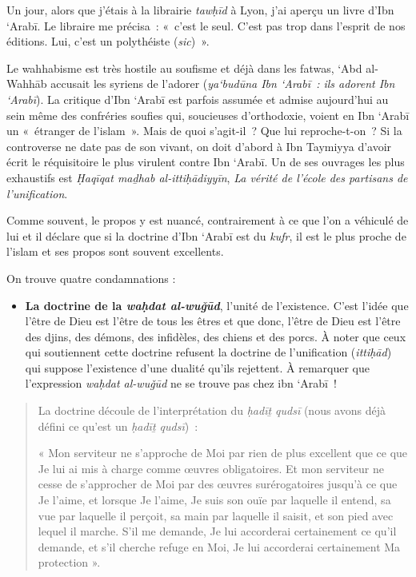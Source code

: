Un jour, alors que j'étais à la librairie \emph{tawḥīd} à Lyon, j'ai
aperçu un livre d'Ibn `Arabī. Le libraire me précisa~: «~c'est le seul.
C'est pas trop dans l'esprit de nos éditions. Lui, c'est un polythéiste
(\emph{sic})~».

Le wahhabisme est très hostile au soufisme et déjà dans les fatwas, `Abd
al-Wahhāb accusait les syriens de l'adorer (\emph{ya`budūna Ibn `Arabī~:
ils adorent Ibn `Arabī}). La critique d'Ibn `Arabī est parfois assumée et
admise aujourd'hui au sein même des confréries soufies qui, soucieuses
d'orthodoxie, voient en Ibn `Arabī un «~étranger de l'islam~». Mais de
quoi s'agit-il~? Que lui reproche-t-on~? Si la controverse ne date pas
de son vivant, on doit d'abord à Ibn Taymiyya d'avoir écrit le
réquisitoire le plus virulent contre Ibn `Arabī. Un de ses ouvrages les
plus exhaustifs est \emph{Ḥaqīqat maḏhab al-ittiḥādiyyīn}, \emph{La
vérité de l'école des partisans de l'unification}.

Comme souvent, le propos y est nuancé, contrairement à ce que l'on a
véhiculé de lui et il déclare que si la doctrine d'Ibn `Arabī est du
\emph{kufr}, il est le plus proche de l'islam et ses propos sont souvent
excellents.

On trouve quatre condamnations :

\begin{itemize}
\item
  \textbf{La doctrine de la \emph{waḥdat al-wuǧūd}}, l'unité de
  l'existence. C'est l'idée que l'être de Dieu est l'être de tous les
  êtres et que donc, l'être de Dieu est l'être des djins, des démons,
  des infidèles, des chiens et des porcs. À noter que ceux qui
  soutiennent cette doctrine refusent la doctrine de l'unification
  (\emph{ittiḥād}) qui suppose l'existence d'une dualité qu'ils
  rejettent. À remarquer que l'expression \emph{waḥdat al-wuǧūd} ne se
  trouve pas chez ibn `Arabī~!
\end{itemize}

\begin{quote}
La doctrine découle de l'interprétation du \emph{ḥadīṯ qudsī} (nous
avons déjà défini ce qu'est un \emph{ḥadīṯ qudsī})~:

« Mon serviteur ne s'approche de Moi par rien de plus excellent que ce
que Je lui ai mis à charge comme œuvres obligatoires. Et mon serviteur
ne cesse de s'approcher de Moi par des œuvres surérogatoires jusqu'à ce
que Je l'aime, et lorsque Je l'aime, Je suis son ouïe par laquelle il
entend, sa vue par laquelle il perçoit, sa main par laquelle il saisit,
et son pied avec lequel il marche. S'il me demande, Je lui accorderai
certainement ce qu'il demande, et s'il cherche refuge en Moi, Je lui
accorderai certainement Ma protection ».
\end{quote}

